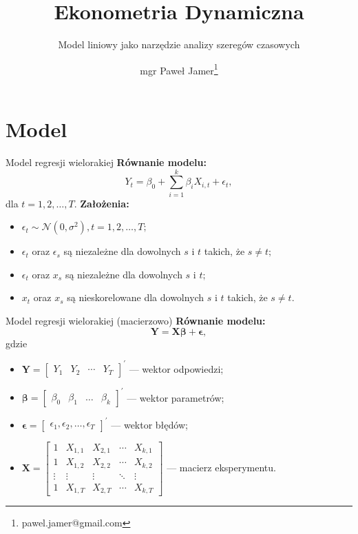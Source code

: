\documentclass[a4paper, 11pt]{beamer}
\title{Ekonometria Dynamiczna}
\subtitle{Model liniowy jako narzędzie analizy szeregów czasowych}
\author{mgr Paweł Jamer\thanks{pawel.jamer@gmail.com}}
\begin{document}
	\begin{frame}
		\titlepage
	\end{frame}
	
	\section{Model}

	\begin{frame}{Model regresji wielorakiej}
		\textbf{Równanie modelu:}
		\[
			Y_t = \beta_0 + \sum_{i=1}^{k} \beta_i X_{i,t} + \epsilon_{t},
		\]
		dla $t = 1, 2, \ldots, T.$
		\newline\newline
		\textbf{Założenia:}
		\begin{itemize}
			\item $\epsilon_t \sim \mathcal{N}\left(0, \sigma^2\right), t = 1, 2, \ldots, T;$
			\item $\epsilon_t$ oraz $\epsilon_s$ są niezależne dla dowolnych $s$ i $t$ takich, że $s \neq t;$
			\item $\epsilon_t$ oraz $x_s$ są niezależne dla dowolnych $s$ i $t;$
			\item $x_t$ oraz $x_s$ są nieskorelowane dla dowolnych $s$ i $t$ takich, że $s \neq t.$
		\end{itemize}
	\end{frame}
	
	\begin{frame}{Model regresji wielorakiej (macierzowo)}
		\textbf{Równanie modelu:}
		\[
			\boldsymbol{Y} = \boldsymbol{X} \boldsymbol{\beta} + \boldsymbol{\epsilon},
		\]
		gdzie
		\begin{itemize}
			\item $\boldsymbol{Y} = \left[\begin{matrix}
				Y_1 & Y_2 & \cdots & Y_T
			\end{matrix}\right]^{\prime}$ --- wektor odpowiedzi;
			\item $\boldsymbol{\beta} = \left[\begin{matrix}
				\beta_0 & \beta_1 & \ldots & \beta_k
			\end{matrix}\right]^{\prime}$ --- wektor parametrów;
			\item $\boldsymbol{\epsilon} = \left[\begin{matrix}
				\epsilon_1, \epsilon_2, \ldots, \epsilon_T
			\end{matrix}\right]^{\prime}$ --- wektor błędów;
			\item $\boldsymbol{X} = \left[\begin{matrix}
				1 & X_{1,1} & X_{2,1} & \cdots & X_{k,1}\\
				1 & X_{1,2} & X_{2,2} & \cdots & X_{k,2}\\
				\vdots & \vdots & \vdots & \ddots & \vdots\\
				1 & X_{1,T} & X_{2,T} & \cdots & X_{k,T}
			\end{matrix}\right]$ --- macierz eksperymentu.
		\end{itemize}
	\end{frame}
\end{document}
